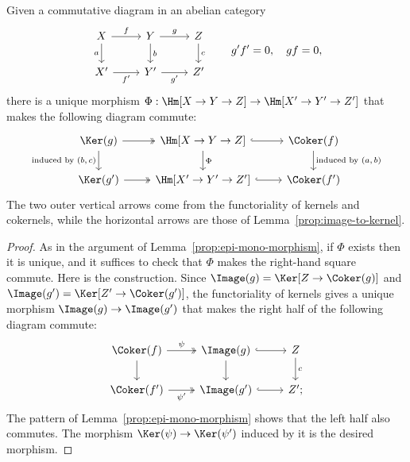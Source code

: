 \begin{proposition}\label{prop:homology-functoriality}
	Given a commutative diagram in an abelian category
	\[\begin{tikzcd}
		X \arrow[r, "f"] \arrow[d, "a"'] & Y \arrow[r, "g"] \arrow[d, "b"] & Z \arrow[d, "c"] \\
		X' \arrow[r, "{f'}"'] & Y' \arrow[r, "{g'}"'] & Z'
	\end{tikzcd} \qquad g'f' = 0, \quad gf = 0, \]
	there is a unique morphism
	$\Phi: \Hm[X \to Y \to Z] \to \Hm[X' \to Y' \to Z']$ that makes the
	following diagram commute:
	\[\begin{tikzcd}
		\Ker(g) \arrow[twoheadrightarrow, r]  \arrow[d, "\text{induced by $(b,c)$}"'] & {\Hm[X \to Y \to Z]} \arrow[hookrightarrow, r] \arrow[d, "\Phi"] & \Coker(f) \arrow[d, "\text{induced by $(a,b)$}"] \\
		\Ker(g') \arrow[twoheadrightarrow, r] & {\Hm[X' \to Y' \to Z']} \arrow[hookrightarrow, r] & \Coker(f')
	\end{tikzcd}\]
	The two outer vertical arrows come from the functoriality of kernels and
	cokernels, while the horizontal arrows are those of
	Lemma~\ref{prop:image-to-kernel}.
\end{proposition}

\begin{proof}
	As in the argument of Lemma~\ref{prop:epi-mono-morphism}, if $\Phi$ exists
	then it is unique, and it suffices to check that $\Phi$ makes the right-hand
	square commute. Here is the construction. Since
	$\Image(g)=\Ker[Z\to\Coker(g)]$ and
	$\Image(g')=\Ker[Z'\to\Coker(g')]$, the functoriality of kernels gives a
	unique morphism $\Image(g)\to\Image(g')$ that makes the right half of the
	following diagram commute:
	\[\begin{tikzcd}
		\Coker(f) \arrow[d] \arrow[twoheadrightarrow, r, "\psi"] & \Image(g) \arrow[d] \arrow[hookrightarrow, r] & Z \arrow[d, "c"] \\
		\Coker(f') \arrow[twoheadrightarrow, r, "{\psi'}"'] & \Image(g') \arrow[hookrightarrow, r] & Z' ;
	\end{tikzcd}\]
	The pattern of Lemma~\ref{prop:epi-mono-morphism} shows that the left half
	also commutes. The morphism $\Ker(\psi)\to\Ker(\psi')$ induced by it is the
	desired morphism.
\end{proof}

